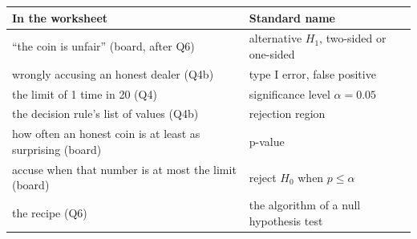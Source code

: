 \documentclass[11pt]{article}
\begin{document}
\smallskip
\begin{center}\small
\begin{tabular}{p{}p{}}
  \toprule
  In the worksheet & Standard name \\
  \midrule
  ``the coin is unfair'' (board, after Q6) & alternative $H_1$, two-sided or one-sided \\
  wrongly accusing an honest dealer (Q4b) & type I error, false positive \\
  the limit of 1 time in 20 (Q4) & significance level $\alpha = 0.05$ \\
  the decision rule's list of values (Q4b) & rejection region \\
  how often an honest coin is at least as surprising (board) & p-value \\
  accuse when that number is at most the limit (board) & reject $H_0$ when $p \le \alpha$ \\
  the recipe (Q6) & the algorithm of a null hypothesis test \\
  \bottomrule
\end{tabular}
\end{center}
\end{document}
